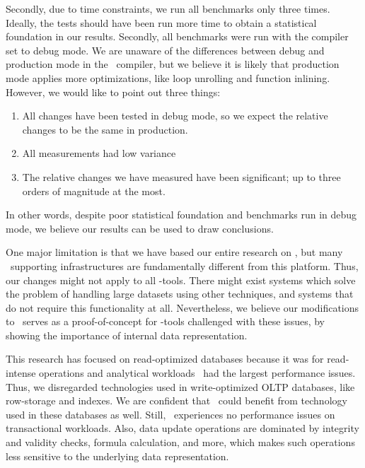 Secondly, due to time constraints, we run all benchmarks only three times. Ideally, the tests should have been run more time to obtain a statistical foundation in our results. Secondly, all benchmarks were run with the compiler set to debug mode. We are unaware of the differences between debug and production mode in the \delphi~compiler, but we believe it is likely that production mode applies more optimizations, like loop unrolling and function inlining. However, we would like to point out three things: 
\begin{enumerate}
    \item All changes have been tested in debug mode, so we expect the relative changes to be the same in production.
    \item All measurements had low variance
    \item The relative changes we have measured have been significant; up to three orders of magnitude at the most.
\end{enumerate}
In other words, despite poor statistical foundation and benchmarks run in debug mode, we believe our results can be used to draw conclusions.

One major limitation is that we have based our entire research on \gap, but many \mde~supporting infrastructures are fundamentally different from this platform. Thus, our changes might not apply to all \mdd-tools. There might exist systems which solve the problem of handling large datasets using other techniques, and systems that do not require this functionality at all. Nevertheless, we believe our modifications to \gap~serves as a proof-of-concept for \mdd-tools challenged with these issues, by showing the importance of internal data representation.

This research has focused on read-optimized databases because it was for read-intense operations and analytical workloads \gap~had the largest performance issues. Thus, we disregarded technologies used in write-optimized OLTP databases, like row-storage and indexes. We are confident that \gap~could benefit from technology used in these databases as well. Still, \genus~experiences no performance issues on transactional workloads. Also, data update operations are dominated by integrity and validity checks, formula calculation, and more, which makes such operations less sensitive to the underlying data representation.